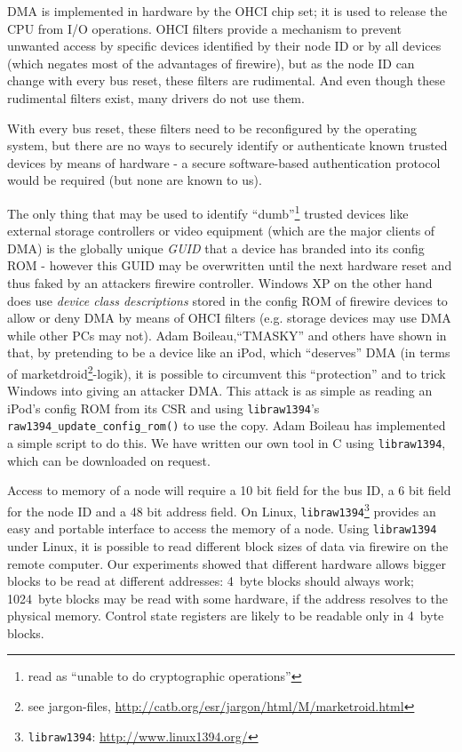 DMA is implemented in hardware by the OHCI chip set; it is used to release the
CPU from I/O operations. OHCI filters provide a mechanism to prevent unwanted
access by specific devices identified by their node ID or by all devices (which
negates most of the advantages of firewire), but as the node ID can change with
every bus reset, these filters are rudimental. And even though these rudimental
filters exist, many drivers do not use them.

With every bus reset, these filters need to be reconfigured by the operating
system, but there are no ways to securely identify or authenticate known trusted
devices by means of hardware - a secure software-based authentication protocol
would be required (but none are known to us).

The only thing that may be used to identify ``dumb''\footnote{read as ``unable
to do cryptographic operations''} trusted devices like external storage
controllers or video equipment (which are the major clients of DMA) is the
globally unique \emph{GUID} that a device has branded into its config ROM -
however this GUID may be overwritten until the next hardware reset and thus
faked by an attackers firewire controller. Windows XP on the other hand does use
\emph{device class descriptions} stored in the config ROM of firewire devices to
allow or deny DMA by means of OHCI filters (e.g.  storage devices may use DMA
while other PCs may not). Adam Boileau,``TMASKY'' and others have shown in
\cite{rux2k6firewire:2006} that, by pretending to be a device like an iPod,
which ``deserves'' DMA (in terms of marketdroid\footnote{see jargon-files,
\href{http://catb.org/esr/jargon/html/M/marketroid.html}
{http://catb.org/esr/jargon/html/M/marketroid.html}}-logik), it is possible to
circumvent this ``protection'' and to trick Windows into giving an attacker DMA.
This attack is as simple as reading an iPod's config ROM from its CSR and using
\texttt{libraw1394}'s \texttt{raw1394\_update\_config\_rom()} to use the copy.
Adam Boileau has implemented a simple script to do this. We have written our own
tool in C using \texttt{libraw1394}, which can be downloaded on request.


Access to memory of a node will require a 10 bit field for the bus ID, a 6 bit
field for the node ID and a 48 bit address field.  On Linux,
\texttt{libraw1394}\footnote{\texttt{libraw1394}:
\href{http://www.linux1394.org/}{http://www.linux1394.org/}} provides an easy
and portable interface to access the memory of a node.  Using
\texttt{libraw1394} under Linux, it is possible to read different block sizes of
data via firewire on the remote computer. Our experiments showed that different
hardware allows bigger blocks to be read at different addresses: 4~byte blocks
should always work; 1024~byte blocks may be read with some hardware, if the
address resolves to the physical memory. Control state registers are likely to
be readable only in 4~byte blocks.


